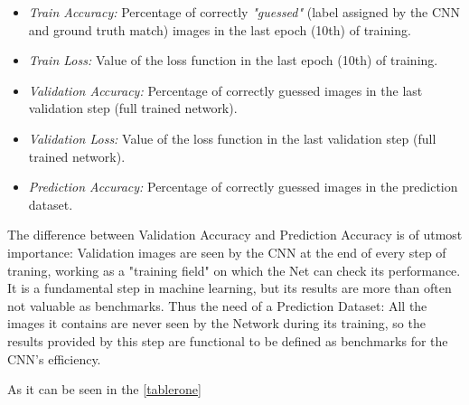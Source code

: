 \documentclass[../main.tex]{subfiles}
\begin{document}
\begin{itemize}
	\item \textit{Train Accuracy:} Percentage of correctly \textit{"guessed"} (label assigned by the CNN and ground truth match) images in the last epoch (10th) of training.
	\item \textit{Train Loss:} Value of the loss function in the last epoch (10th) of training.
	\item \textit{Validation Accuracy:} Percentage of correctly guessed images in the last validation step (full trained network).
	\item \textit{Validation Loss:} Value of the loss function in the last validation step (full trained network).
	\item \textit{Prediction Accuracy:} Percentage of correctly guessed images in the prediction dataset.
\end{itemize}

The difference between Validation Accuracy and Prediction Accuracy is of utmost importance: Validation images are seen by the CNN at the end of every step of traning, working as a "training field" on which the Net can check its performance. It is a fundamental step in machine learning, but its results are more than often not valuable as benchmarks. Thus the need of a Prediction Dataset: All the images it contains are never seen by the Network during its training, so the results provided by this step are functional to be defined as benchmarks for the CNN's efficiency.

As it can be seen in the \ref{tablerone}
\end{document}
